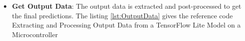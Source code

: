 \begin{itemize}
	\item \textbf{Get Output Data}: The output data is extracted and post-processed to get the final predictions. 
	The listing \ref{lst:OutputData} gives the reference code Extracting and Processing Output Data from a TensorFlow Lite Model																																 on a Microcontroller
	\begin{code}
		
	\end{code}
	
\end{itemize}

%

